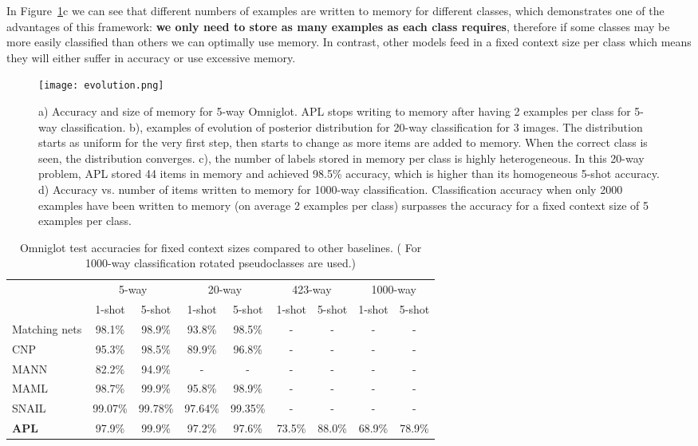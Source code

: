 \documentclass{article} \usepackage{iclr2019_conference,times}
\begin{document}
In Figure~\ref{fig:evolution}c we can see that different numbers of examples are written to memory for different classes, which demonstrates one of the advantages of this framework: \textbf{we only need to store as many examples as each class requires}, therefore if some classes may be more easily classified than others we can optimally use memory. In contrast, other models feed in a fixed context size per class which means they will either suffer in accuracy or use excessive memory.

\begin{figure}[ht]
\begin{center}
\texttt{[image: evolution.png]}
\end{center}
\caption{a) Accuracy and size of memory for 5-way Omniglot. APL stops writing to memory after having 2 examples per class for 5-way classification. b), examples of evolution of posterior distribution for 20-way classification for 3 images. The distribution starts as uniform for the very first step, then starts to change as more items are added to memory. When the correct class is seen, the distribution converges. c), the number of labels stored in memory per class is highly heterogeneous. In this 20-way problem, APL stored 44 items in memory and achieved 98.5\% accuracy, which is higher than its homogeneous 5-shot accuracy. d) Accuracy vs. number of items written to memory for 1000-way classification. Classification accuracy when only 2000 examples have been written to memory (on average 2 examples per class) surpasses the accuracy for a fixed context size of 5 examples per class.}
\label{fig:evolution}
\end{figure}

\begin{table}[ht]
\centering
\begin{tabularx}{\textwidth}{lcccccccc}
& \multicolumn{2}{c}{5-way} & \multicolumn{2}{c}{20-way} & \multicolumn{2}{c}{423-way} & \multicolumn{2}{c}{1000-way} \\
\cline{2-9}
& 1-shot & 5-shot & 1-shot & 5-shot & 1-shot & 5-shot & 1-shot & 5-shot \\
\hline
Matching nets & 98.1\% & 98.9\% & 93.8\% & 98.5\% & - & - & - & - \\
CNP & 95.3\% & 98.5\% & 89.9\% & 96.8\% & - & - & - & -\\
MANN & 82.2\% & 94.9\% & - & - & - & -  & - & -\\
MAML & 98.7\% & 99.9\% & 95.8\% & 98.9\% & - & - & - & -\\
SNAIL & 99.07\% & 99.78\% & 97.64\% & 99.35\% & - & - & - & - \\
\hline
\textbf{APL} & 97.9\% & 99.9\% & 97.2\% & 97.6\% & 73.5\% & 88.0\%  & 68.9\% & 78.9\% \\
\hline
\end{tabularx}
\caption{Omniglot test accuracies for fixed context sizes compared to other baselines. ( For 1000-way classification rotated pseudoclasses are used.)}
\label{table:onniglot}
\end{table}
\end{document}
